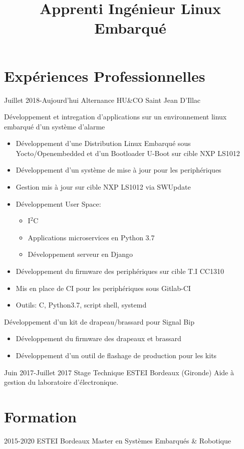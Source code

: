 \documentclass[9pts,a4paper,sans]{moderncv}
\title{Apprenti Ingénieur Linux Embarqué }
\begin{document}
\maketitle

\section{Expériences Professionnelles}
\cventry{} {Juillet 2018-Aujourd'hui} {Alternance} {HU\&CO} {Saint Jean D'Illac} {
	Développement et intregation d'applications sur un environnement linux embarqué d'un système d'alarme
	\begin{itemize}
		\item Développement d'une Distribution Linux Embarqué sous Yocto/Openembedded et d'un Bootloader U-Boot sur cible NXP LS1012
		\item Développement d'un système de mise à jour pour les periphériques
		\item Gestion mis à jour sur cible NXP LS1012 via SWUpdate 
		\item Développement User Space:
		\begin{itemize}
			\item I$^{2}$C
			\item Applications microservices en Python 3.7
			\item Développement serveur en Django
		\end{itemize}
		\item Développement du firmware des periphériques sur cible T.I CC1310
		\item Mis en place de CI pour les periphériques sous Gitlab-CI 
		\item Outils: C, Python3.7, script shell, systemd 
	\end{itemize}
	Développement d'un kit de drapeau/brassard pour Signal Bip
	\begin{itemize}
		\item Développement du firmware des drapeaux et brassard
		\item Développement d'un outil de flashage de production pour les kits
	\end{itemize}
}

\cventry{} {Juin 2017-Juillet 2017} {Stage Technique} {ESTEI} {Bordeaux (Gironde)} {Aide à gestion du laboratoire d’électronique.} {}
{} {}

\section{Formation}
\cventry{} {2015-2020} {ESTEI} {Bordeaux} {Master en Systèmes Embarqués \& Robotique} {}
\end{document}
